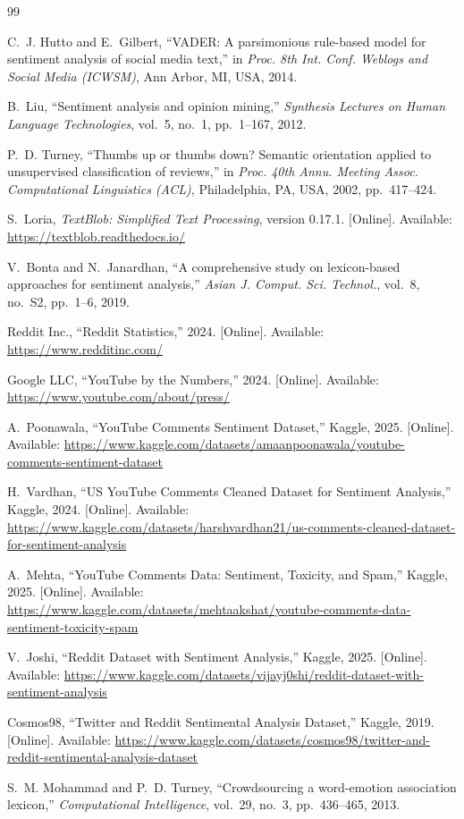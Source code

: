 \documentclass[conference]{IEEEtran}
\begin{document}
\begin{thebibliography}{99}

C.~J. Hutto and E.~Gilbert,
``VADER: A parsimonious rule-based model for sentiment analysis of social
  media text,''
in \textit{Proc. 8th Int. Conf. Weblogs and Social Media (ICWSM)},
Ann Arbor, MI, USA, 2014.

B.~Liu,
``Sentiment analysis and opinion mining,''
\textit{Synthesis Lectures on Human Language Technologies},
vol.~5, no.~1, pp.~1--167, 2012.

P.~D. Turney,
``Thumbs up or thumbs down? Semantic orientation applied to unsupervised
  classification of reviews,''
in \textit{Proc. 40th Annu. Meeting Assoc. Computational Linguistics (ACL)},
Philadelphia, PA, USA, 2002, pp.~417--424.

S.~Loria,
\textit{TextBlob: Simplified Text Processing}, version 0.17.1.
[Online]. Available: \url{https://textblob.readthedocs.io/}

V.~Bonta and N.~Janardhan,
``A comprehensive study on lexicon-based approaches for sentiment analysis,''
\textit{Asian J. Comput. Sci. Technol.}, vol.~8, no.~S2, pp.~1--6, 2019.

Reddit Inc.,
``Reddit Statistics,'' 2024.
[Online]. Available: \url{https://www.redditinc.com/}

Google LLC,
``YouTube by the Numbers,'' 2024.
[Online]. Available: \url{https://www.youtube.com/about/press/}

A.~Poonawala,
``YouTube Comments Sentiment Dataset,''
Kaggle, 2025.
[Online]. Available: \url{https://www.kaggle.com/datasets/amaanpoonawala/youtube-comments-sentiment-dataset}

H.~Vardhan,
``US YouTube Comments Cleaned Dataset for Sentiment Analysis,''
Kaggle, 2024.
[Online]. Available: \url{https://www.kaggle.com/datasets/harshvardhan21/us-comments-cleaned-dataset-for-sentiment-analysis}

A.~Mehta,
``YouTube Comments Data: Sentiment, Toxicity, and Spam,''
Kaggle, 2025.
[Online]. Available: \url{https://www.kaggle.com/datasets/mehtaakshat/youtube-comments-data-sentiment-toxicity-spam}

V.~Joshi,
``Reddit Dataset with Sentiment Analysis,''
Kaggle, 2025.
[Online]. Available: \url{https://www.kaggle.com/datasets/vijayj0shi/reddit-dataset-with-sentiment-analysis}

Cosmos98,
``Twitter and Reddit Sentimental Analysis Dataset,''
Kaggle, 2019.
[Online]. Available: \url{https://www.kaggle.com/datasets/cosmos98/twitter-and-reddit-sentimental-analysis-dataset}

S.~M. Mohammad and P.~D. Turney,
``Crowdsourcing a word-emotion association lexicon,''
\textit{Computational Intelligence}, vol.~29, no.~3, pp.~436--465, 2013.

\end{thebibliography}
\end{document}
